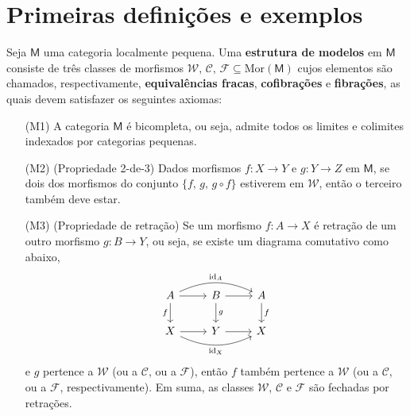 \section{Primeiras definições e exemplos}

\begin{defin}\label{defin:estrutura_de_modelos}
  Seja $\mathsf{M}$ uma categoria localmente pequena.
  Uma \textbf{estrutura de modelos} em $\mathsf{M}$ consiste de três classes de morfismos $\mathcal{W},\, \mathcal{C},\, \mathcal{F} \subseteq \mathrm{Mor}(\mathsf{M})$ cujos elementos são chamados, respectivamente, \textbf{equivalências fracas}, \textbf{cofibrações} e \textbf{fibrações}, as quais devem satisfazer os seguintes axiomas:
  \begin{enumerate}
  \item[(M1)] A categoria $\mathsf{M}$ é bicompleta, ou seja, admite todos os limites e colimites indexados por categorias pequenas.
    
  \item[(M2)] (Propriedade 2-de-3) Dados morfismos $f: X \to Y$ e $g: Y \to Z$ em $\mathsf{M}$, se dois dos morfismos do conjunto $\{f,\,g,\, g \circ f\}$ estiverem em $\mathcal{W}$, então o terceiro também deve estar.
    
  \item[(M3)] (Propriedade de retração) Se um morfismo $f: A \to X$ é retração de um outro morfismo $g: B \to Y$, ou seja, se existe um diagrama comutativo como abaixo,
    \begin{equation}\label{eq:diagrama_axioma_de_retracao}
      \begin{tikzcd}
        A
        \arrow[r]
        \arrow[d, "f" swap]
        \arrow[rr, bend left=25, "\id_{A}"]
        & B
        \arrow[r]
        \arrow[d, "g"]
        & A
        \arrow[d, "f"]
        \\ X
        \arrow[r]
        \arrow[rr, bend right=25, "\id_{X}" swap]
        & Y
        \arrow[r]
        & X
      \end{tikzcd}
    \end{equation}
    e $g$ pertence a $\mathcal{W}$ (ou a $\mathcal{C}$, ou a $\mathcal{F}$), então $f$ também pertence a $\mathcal{W}$ (ou a $\mathcal{C}$, ou a $\mathcal{F}$, respectivamente).
    Em suma, as classes $\mathcal{W}$, $\mathcal{C}$ e $\mathcal{F}$ são fechadas por retrações.
    

\end{enumerate}
\end{defin}
